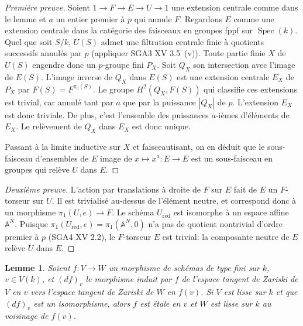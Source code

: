 \documentclass[11pt,a4paper]{article}
\theoremstyle{plain}
\newtheorem{lemma}[theorem]{Lemme}
\theoremstyle{definition}
\DeclareMathOperator{\Spec}{Spec}
\newcommand{\red}{\mathrm{r\acute{e}d}}
\begin{document}
\begin{proof}[Premi\`ere preuve]
Soient $1 \to F \to E \to U \to 1$ une extension centrale comme dans le lemme et $a$ un entier premier \`a $p$ qui annule $F$. Regardons $E$ comme une extension centrale dans la cat\'egorie des faisceaux en groupes fppf sur $\Spec(k)$. Quel que soit $S/k$, $U(S)$ admet une filtration centrale finie \`a quotients successifs annul\'es par $p$ (appliquer SGA3 XV 3.5~(v)). Toute partie finie $X$ de $U(S)$ engendre donc un $p$-groupe fini $P_X$. Soit $Q_X$ son intersection avec l'image de $E(S)$. L'image inverse de $Q_X$ dans $E(S)$ est une extension centrale $E_X$ de $P_X$ par $F(S) = F^{\pi_0(S)}$. Le groupe $H^2(Q_X, F(S))$ qui classifie ces extensions est trivial, car annul\'e tant par $a$ que par la puissance $|Q_X|$ de $p$. L'extension $E_X$ est donc triviale. De plus, c'est l'ensemble des puissances $a$-i\`emes d'\'el\'ements de $E_X$. Le rel\`evement de $Q_X$ dans $E_X$ est donc unique.

Passant \`a la limite inductive sur $X$ et faisceautisant, on en d\'eduit que le sous-faisceau d'ensembles de $E$ image de $x \mapsto x^a: E \to E$ est un sous-faisceau en groupes qui rel\`eve $U$ dans $E$.
\end{proof}

\begin{proof}[Deuxi\`eme preuve]
L'action par translations \`a droite de $F$ sur $E$ fait de $E$ un $F$-torseur sur $U$. Il est trivialis\'e au-dessus de l'\'el\'ement neutre, et correspond donc \`a un morphisme $\pi_1(U,e) \to F$. Le sch\'ema $U_\red$ est isomorphe \`a un espace affine $\mathbb{A}^N$. Puisque $\pi_1(U_\red,e) = \pi_1(\mathbb{A}^N,0)$ n'a pas de quotient nontrivial d'ordre premier \`a $p$ (SGA4 XV 2.2), le $F$-torseur $E$ est trivial: la composante neutre de $E$ rel\`eve $U$ dans $E$.
\end{proof}

\begin{lemma}\label{lem:1.9}
Soient $f: V \to W$ un morphisme de sch\'emas de type fini sur $k$, $v \in V(k)$, et $(df)_v$ le morphisme induit par $f$ de l'espace tangent de Zariski de $V$ en $v$ vers l'espace tangent de Zariski de $W$ en $f(v)$. Si $V$ est lisse sur $k$ et que $(df)_v$ est un isomorphisme, alors $f$ est \'etale en $v$ et $W$ est lisse sur $k$ au voisinage de $f(v)$.
\end{lemma}
\end{document}
